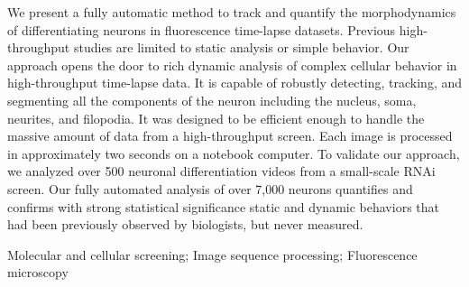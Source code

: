 
We present a fully automatic method  to track and quantify the morphodynamics of differentiating neurons  in fluorescence  time-lapse datasets.  Previous high-throughput studies are limited to static analysis or simple behavior. Our approach opens the door to rich dynamic analysis of complex cellular behavior in high-throughput time-lapse data. It is capable of  robustly detecting, tracking,  and segmenting all the  components of the neuron including the nucleus, soma, neurites, and filopodia. It was designed to be efficient enough to handle the massive amount of data from a high-throughput screen. Each image is processed in approximately two seconds on a notebook computer. To validate  our approach,  we analyzed over 500 neuronal differentiation videos from a small-scale RNAi screen. Our fully automated analysis of over 7,000 neurons quantifies  and  confirms with strong statistical significance static and dynamic behaviors that  had  been previously observed by biologists, but never measured. 




\begin{keywords}
Molecular and cellular screening; Image sequence processing; Fluorescence microscopy
\end{keywords}

